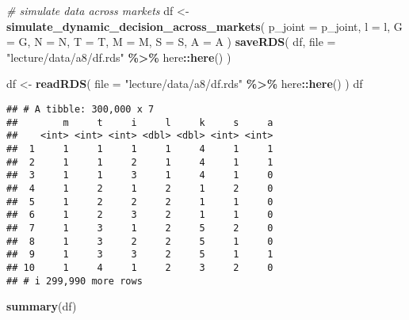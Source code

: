 \documentclass[
]{book}
\newenvironment{Shaded}{\begin{snugshade}}{\end{snugshade}}
\newcommand{\AttributeTok}[1]{\textcolor[rgb]{0.13,0.29,0.53}{#1}}
\newcommand{\CommentTok}[1]{\textcolor[rgb]{0.56,0.35,0.01}{\textit{#1}}}
\newcommand{\FunctionTok}[1]{\textcolor[rgb]{0.13,0.29,0.53}{\textbf{#1}}}
\newcommand{\NormalTok}[1]{#1}
\newcommand{\OtherTok}[1]{\textcolor[rgb]{0.56,0.35,0.01}{#1}}
\newcommand{\SpecialCharTok}[1]{\textcolor[rgb]{0.81,0.36,0.00}{\textbf{#1}}}
\newcommand{\StringTok}[1]{\textcolor[rgb]{0.31,0.60,0.02}{#1}}
\begin{document}
\begin{Shaded}
\begin{Highlighting}[]
\CommentTok{\# simulate data across markets}
\NormalTok{df }\OtherTok{\textless{}{-}} 
  \FunctionTok{simulate\_dynamic\_decision\_across\_markets}\NormalTok{(}
    \AttributeTok{p\_joint =}\NormalTok{ p\_joint,}
    \AttributeTok{l =}\NormalTok{ l,}
    \AttributeTok{G =}\NormalTok{ G,}
    \AttributeTok{N =}\NormalTok{ N,}
    \AttributeTok{T =}\NormalTok{ T,}
    \AttributeTok{M =}\NormalTok{ M,}
    \AttributeTok{S =}\NormalTok{ S,}
    \AttributeTok{A =}\NormalTok{ A}
\NormalTok{    )}
\FunctionTok{saveRDS}\NormalTok{(}
\NormalTok{  df,}
  \AttributeTok{file =} \StringTok{"lecture/data/a8/df.rds"} \SpecialCharTok{\%\textgreater{}\%}\NormalTok{ here}\SpecialCharTok{::}\FunctionTok{here}\NormalTok{()}
\NormalTok{)}
\end{Highlighting}
\end{Shaded}

\begin{Shaded}
\begin{Highlighting}[]
\NormalTok{df }\OtherTok{\textless{}{-}} 
  \FunctionTok{readRDS}\NormalTok{(}
    \AttributeTok{file =} \StringTok{"lecture/data/a8/df.rds"} \SpecialCharTok{\%\textgreater{}\%}\NormalTok{ here}\SpecialCharTok{::}\FunctionTok{here}\NormalTok{()}
\NormalTok{  )}
\NormalTok{df}
\end{Highlighting}
\end{Shaded}

\begin{verbatim}
## # A tibble: 300,000 x 7
##        m     t     i     l     k     s     a
##    <int> <int> <int> <dbl> <dbl> <int> <int>
##  1     1     1     1     1     4     1     1
##  2     1     1     2     1     4     1     1
##  3     1     1     3     1     4     1     0
##  4     1     2     1     2     1     2     0
##  5     1     2     2     2     1     1     0
##  6     1     2     3     2     1     1     0
##  7     1     3     1     2     5     2     0
##  8     1     3     2     2     5     1     0
##  9     1     3     3     2     5     1     1
## 10     1     4     1     2     3     2     0
## # i 299,990 more rows
\end{verbatim}

\begin{Shaded}
\begin{Highlighting}[]
\FunctionTok{summary}\NormalTok{(df)}
\end{Highlighting}
\end{Shaded}
\end{document}
